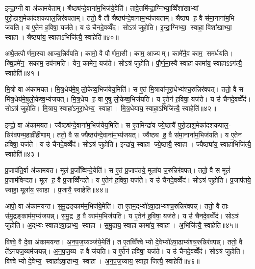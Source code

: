 इ॒न्द्रा॒ग्नी वा अ॑कामयेताम्। श्रैष्ठ्य॑न्दे॒वाना॑म॒भिज॑ये॒वेति॑। तावे॒तमि॑न्द्रा॒ग्निभ्या॒व्विँशा॑खाभ्यां पुरो॒डाश॒मेका॑दशकपाल॒न्निर॑वपताम्। ततो॒ वै तौ श्रैष्ठ्य॑न्दे॒वाना॑म॒भ्य॑जयताम्। श्रैष्ठ्य ह॒ वै स॑मा॒नाना॑म॒भि ज॑यति। य ए॒तेन॑ ह॒विषा॒ यज॑ते। य उ॑ चैनदे॒वव्वेँद॑। सोऽत्र॑ जुहोति। इ॒न्द्रा॒ग्निभ्या॒ स्वाहा॒ विशा॑खाभ्या॒ स्वाहा। श्रैष्ठ्या॑य॒ स्वाहा॒ऽभिजि॑त्यै॒ स्वाहेति॑॥४०॥

अथै॒तत्पौर्णमा॒स्या आज्य॒न्निर्व॑पति। कामो॒ वै पौर्णमा॒सी। काम॒ आज्यम्। कामे॑नै॒व काम॒ सम॑र्धयति। ख्षि॒प्रमे॑न॒ सकाम॒ उप॑नमति। येन॒ कामे॑न॒ यज॑ते। सोऽत्र॑ जुहोति। पौ॒र्ण॒मा॒स्यै स्वाहा॒ कामा॑य॒ स्वाहाऽऽग॑त्यै॒ स्वाहेति॑॥४१॥\anuvakamend[अ॒ग्निः पञ्च॑दश प्र॒जाप॑ति॒ष्षोड॑श॒ सोम॒ एका॑दश रु॒द्रो दश॒र्ख्षैका॑दश॒ बृह॒स्पति॒र्दश॑ देवासु॒रा नव॑ पि॒तर॒ एका॑दशार्य॒मा भगो॒ दश॑ दश सवि॒ता चतु॑र्दश॒ त्वष्टा॑ वा॒युरि॑न्द्रा॒ग्नी दश॑ द॒शाथै॒तत्पौर्णमा॒स्या अ॒ष्टौ पञ्च॑दश]

मि॒त्रो वा अ॑कामयत। मि॒त्र॒धेय॑मे॒षु लो॒केष्व॒भिज॑येय॒मिति॑। स ए॒तं मि॒त्राया॑नूरा॒धेभ्य॑श्च॒रुन्निर॑वपत्। ततो॒ वै स मि॑त्र॒धेय॑मे॒षुलो॒केष्व॒भ्य॑जयत्। मि॒त्र॒धेय ह॒ वा ए॒षु लो॒केष्व॒भिज॑यति। य ए॒तेन॑ ह॒विषा॒ यज॑ते। य उ॑ चैनदे॒वव्वेँद॑। सोऽत्र॑ जुहोति। मि॒त्राय॒ स्वाहा॑ऽनूरा॒धेभ्य॒ स्वाहा। मि॒त्र॒धेया॑य॒ स्वाहा॒ऽभिजि॑त्यै॒ स्वाहेति॑॥४२॥

इन्द्रो॒ वा अ॑कामयत। ज्यैष्ठ्य॑न्दे॒वाना॑म॒भिज॑येय॒मिति॑। स ए॒तमिन्द्रा॑य ज्ये॒ष्ठायै॑ पुरो॒डाश॒मेका॑दशकपाल॒- न्निर॑वपन्म॒हाव्री॑हीणाम्। ततो॒ वै स ज्यैष्ठ्य॑न्दे॒वाना॑म॒भ्य॑जयत्। ज्यैष्ठ्य ह॒ वै स॑मा॒नाना॑म॒भिज॑यति। य ए॒तेन॑ ह॒विषा॒ यज॑ते। य उ॑ चैनदे॒वव्वेँद॑। सोऽत्र॑ जुहोति। इन्द्रा॑य॒ स्वाहा ज्ये॒ष्ठायै॒ स्वाहा। ज्यैष्ठ्या॑य॒ स्वाहा॒भिजि॑त्यै॒ स्वाहेति॑॥४३॥

प्र॒जाप॑ति॒र्वा अ॑कामयत। मूलं॑ प्र॒जाँव्वि॑न्दे॒येति॑। स ए॒तं प्र॒जाप॑तये॒ मूला॑य च॒रुन्निर॑वपत्। ततो॒ वै स मूलं॑ प्र॒जाम॑विन्दत। मूल ह॒ वै प्र॒जाव्विँ॑न्दते। य ए॒तेन॑ ह॒विषा॒ यज॑ते। य उ॑ चैनदे॒वव्वेँद॑। सोऽत्र॑ जुहोति। प्र॒जाप॑तये॒ स्वाहा॒ मूला॑य॒ स्वाहा। प्र॒जायै॒ स्वाहेति॑॥४४॥

आपो॒ वा अ॑कामयन्त। स॒मु॒द्रङ्काम॑म॒भिज॑ये॒मेति॑। ता ए॒तम॒द्भ्यो॑ऽषा॒ढाभ्य॑श्च॒रुन्निर॑वपन्न्। ततो॒ वै ताः स॑मु॒द्रङ्काम॑म॒भ्य॑जयन्न्। स॒मु॒द्र ह॒ वै काम॑म॒भिज॑यति। य ए॒तेन॑ ह॒विषा॒ यज॑ते। य उ॑ चैनदे॒वव्वेँद॑। सोऽत्र॑ जुहोति। अ॒द्भ्यः स्वाहा॑ऽषा॒ढाभ्य॒ स्वाहा। स॒मु॒द्राय॒ स्वाहा॒ कामा॑य॒ स्वाहा। अ॒भिजि॑त्यै॒ स्वाहेति॑॥४५॥

विश्वे॒ वै दे॒वा अ॑कामयन्त। अ॒न॒प॒ज॒य्यञ्ज॑ये॒मेति॑। त ए॒तव्विँश्वेभ्यो दे॒वेभ्यो॑ऽषा॒ढाभ्य॑श्च॒रुन्निर॑वपन्न्। ततो॒ वै ते॑ऽनपज॒य्यम॑जयन्न्। अ॒न॒प॒ज॒य्य ह॒ वै ज॑यति। य ए॒तेन॑ ह॒विषा॒ यज॑ते। य उ॑ चैनदे॒वव्वेँद॑। सोऽत्र॑ जुहोति। विश्वेभ्यो दे॒वेभ्य॒ स्वाहा॑ऽषा॒ढाभ्य॒ स्वाहा। अ॒न॒प॒ज॒य्याय॒ स्वाहा॒ जित्यै॒ स्वाहेति॑॥४६॥

